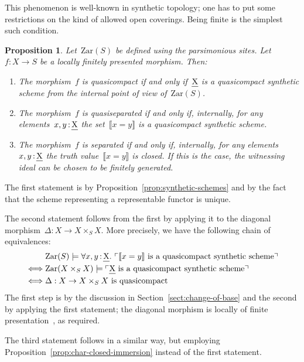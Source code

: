 \documentclass[10pt,reqno,a4paper]{amsbook}
\makeatletter
\theoremstyle{definition}
\theoremstyle{plain}
\newtheorem{prop}[defn]{Proposition}
\theoremstyle{remark}
\let\oldul\ul
\renewcommand{\ul}[1]{\text{\oldul{$#1$}}}
\newcommand{\Zar}{\mathrm{Zar}}
\newcommand{\?}{\,{:}\,}
\renewcommand{\_}{\mathpunct{.}\,}
\newcommand{\speak}[1]{\ulcorner\text{\textnormal{#1}}\urcorner}
\newcommand{\brak}[1]{{\llbracket{#1}\rrbracket}}
\newcommand{\stacksproject}[1]{\cite[{\href{http://stacks.math.columbia.edu/tag/#1}{Tag~#1}}]{stacks-project}}
\renewenvironment{proof}[1][\proofname]{\par
  \pushQED{\qed}%
  \normalfont \topsep6\p@\@plus6\p@\relax
  \trivlist
  \item[\hskip\labelsep
        \itshape
    #1\@addpunct{.}]\ignorespaces
}{%
  \popQED\endtrivlist\@endpefalse
}
\makeatother
\begin{document}
This phenomenon is well-known in synthetic topology; one has to put some
restrictions on the kind of allowed open coverings. Being finite is the
simplest such condition.

\begin{prop}\label{prop:big-char-qcqs}
Let~$\Zar(S)$ be defined using the parsimonious sites. Let~$f : X \to
S$ be a locally finitely presented morphism. Then:
\begin{enumerate}
\item The morphism~$f$ is quasicompact if and only if~$\ul{X}$ is a
quasicompact synthetic scheme from the internal point of view of~$\Zar(S)$.
\item The morphism~$f$ is quasiseparated if and only if, internally, for any
elements~$x,y \? \ul{X}$ the set~$\brak{x = y}$ is a quasicompact synthetic
scheme.
\item The morphism~$f$ is separated if and only if, internally, for any
elements~$x,y \? \ul{X}$ the truth value~$\brak{x = y}$ is closed. If this is
the case, the witnessing ideal can be chosen to be finitely generated.
\end{enumerate}
\end{prop}

\begin{proof}The first statement is by Proposition~\ref{prop:synthetic-schemes}
and by the fact that the scheme representing a representable functor is unique.

The second statement follows from the first by applying it to the diagonal
morphism~$\Delta : X \to X \times_S X$. More precisely, we have the following
chain of equivalences:
\begin{align*}
  &\mathrel{\phantom{\Longleftrightarrow}}
  \Zar(S) \models \forall x,y\?\ul{X}\_
    \speak{$\brak{x = y}$ is a quasicompact synthetic scheme} \\
  &\Longleftrightarrow
  \Zar(X \times_S X) \models
    \speak{$\ul{X}$ is a quasicompact synthetic scheme} \\
  &\Longleftrightarrow
  \text{$\Delta : X \to X \times_S X$ is quasicompact}
\end{align*}
The first step is by the discussion in Section~\ref{sect:change-of-base} and
the second by applying the first statement; the diagonal morphism is locally of
finite presentation~\stacksproject{0818}, as required.

The third statement follows in a similar way, but employing
Proposition~\ref{prop:char-closed-immersion} instead of the first statement.
\end{proof}
\end{document}
